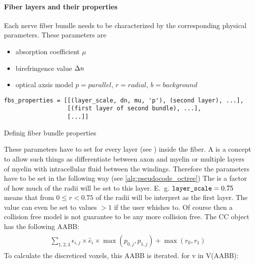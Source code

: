 \paragraph{Fiber layers and their properties}
Each nerve fiber bundle needs to be characterized by the corresponding physical parameters.
These parameters are 
\begin{itemize}[nosep]
    \item absorption coefficient $\mu$
    \item birefringence value $\Delta n$
    \item optical axsis model $p=\mathit{parallel}$, $r=\mathit{radial}$, $b=\mathit{background}$
\end{itemize}
%
\begin{lstfloat}[!tb]
\lstset{style=python}
\begin{lstlisting}[]
fbs_properties = [[(layer_scale, dn, mu, 'p'), (second layer), ...],
                  [(first layer of second bundle), ...],
                  [...]]
\end{lstlisting}
\caption{Definig fiber bundle properties}
\label{alg:pseudocode_octree}
\end{lstfloat}
% 
% 
These parameters have to set for every layer (see ) inside the fiber.
A  is a concept to allow such things as differentiate between axon and myelin or multiple layers of myelin with intracellular fluid between the windings.
Therefore the parameters have to be set in the following way (see \cref{alg:pseudocode_octree})
% 
The  is a factor of how much of the radii will be set to this layer.
E.\ g. $\texttt{layer\_scale}=0.75$ means that from $0\leq r < 0.75$ of the radii will be interpret as the first layer.
The value can even be set to values $>1$ if the user whishes to.
Of course then a collision free model is not guarantee to be any more collision free.
% 
The \ac{CC} object has the following \ac{AABB}:
\begin{align}
\begin{split}
    \sum_{1,2,3} \epsilon_{i,j} \times \hat{e}_i \times \max(p_{0,j}, p_{1,j}) + \max(r_0, r_1)
\end{split}
\end{align}
To calculate the discreticed voxels, this \ac{AABB} is iterated. for v in V(AABB): \dummy{}
